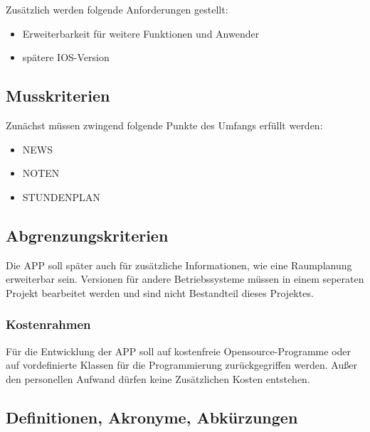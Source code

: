 Zusätzlich werden folgende Anforderungen gestellt:

\begin{itemize}
	\item Erweiterbarkeit für weitere Funktionen und Anwender
	\item spätere IOS-Version
\end{itemize}


\subsection{\textbf{Musskriterien}}

Zunächst müssen zwingend folgende Punkte des Umfangs erfüllt werden:

\begin{itemize}
   	\item NEWS
   	\item NOTEN
   	\item STUNDENPLAN   
\end{itemize}

\subsection{\textbf{Abgrenzungskriterien}}

Die \acs{APP} soll später auch für zusätzliche Informationen, wie eine Raumplanung erweiterbar sein. Versionen für andere Betriebssysteme müssen in einem seperaten Projekt bearbeitet werden und sind nicht Bestandteil dieses Projektes.			

\subsubsection{Kostenrahmen}

Für die Entwicklung der \acs{APP} soll auf kostenfreie Opensource-Programme oder auf vordefinierte Klassen für die Programmierung zurückgegriffen werden.
Außer den personellen Aufwand dürfen keine Zusätzlichen Kosten entstehen.


\subsection{\textbf{Definitionen, Akronyme, Abkürzungen}}
\begin{acronym}[UV-Licht]


\end{acronym}

